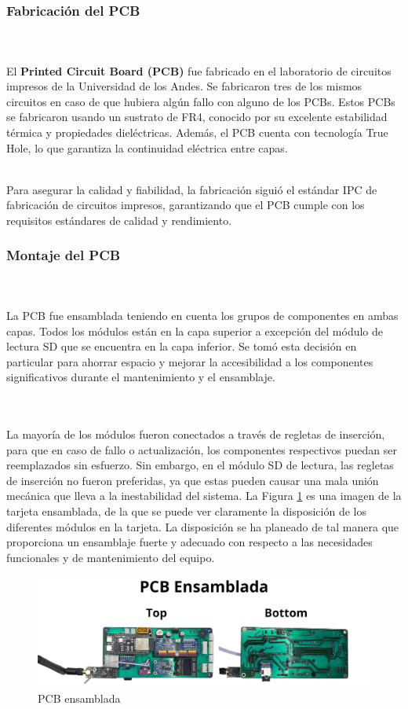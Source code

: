 \\ \\
\subsubsection{Fabricación del PCB}
\\ \\
El \textbf{Printed Circuit Board (PCB)} fue fabricado en el laboratorio de circuitos impresos de la Universidad de los Andes. Se fabricaron tres de los mismos circuitos en caso de que hubiera algún fallo con alguno de los PCBs. Estos PCBs se fabricaron usando un sustrato de FR4, conocido por su excelente estabilidad térmica y propiedades dieléctricas. Además, el PCB cuenta con tecnología True Hole, lo que garantiza la continuidad eléctrica entre capas.

\\
Para asegurar la calidad y fiabilidad, la fabricación siguió el estándar IPC de fabricación de circuitos impresos, garantizando que el PCB cumple con los requisitos estándares de calidad y rendimiento.
\\

\subsubsection{ Montaje del PCB}
\\ \\

La PCB fue ensamblada teniendo en cuenta los grupos de componentes en ambas capas. Todos los módulos están en la capa superior a excepción del módulo de lectura SD que se encuentra en la capa inferior. Se tomó esta decisión en particular para ahorrar espacio y mejorar la accesibilidad a los componentes significativos durante el mantenimiento y el ensamblaje.

\\ \\

La mayoría de los módulos fueron conectados a través de regletas de inserción, para que en caso de fallo o actualización, los componentes respectivos puedan ser reemplazados sin esfuerzo. Sin embargo, en el módulo SD de lectura, las regletas de inserción no fueron preferidas, ya que estas pueden causar una mala unión mecánica que lleva a la inestabilidad del sistema. La Figura \ref{fig:ensamblada} es una imagen de la tarjeta ensamblada, de la que se puede ver claramente la disposición de los diferentes módulos en la tarjeta. La disposición se ha planeado de tal manera que proporciona un ensamblaje fuerte y adecuado con respecto a las necesidades funcionales y de mantenimiento del equipo.

\begin{figure}[H]
    \centering
    \includegraphics[width=\textwidth]{Imagenes/Metodologia/pcb_ensamblada.png}
    \caption{PCB ensamblada}
    \label{fig:ensamblada}
\end{figure}
\vspace{5 px}\\ \\